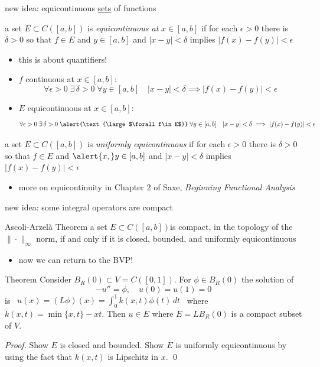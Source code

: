 \documentclass[10pt,
               svgnames,
               hyperref={colorlinks,
                         citecolor=DeepPink4,
                         linkcolor=FireBrick,
                         urlcolor=Maroon},
               usepdftitle=false]{beamer}
\newcommand{\eps}{\epsilon}
\newcommand{\textbook}{Saxe, \emph{Beginning Functional Analysis}}
\begin{document}
\begin{frame}{new idea: equicontinuous \underline{sets} of functions}

\begin{definition}
a set $E \subset C([a,b])$ is \emph{equicontinuous at } $x\in[a,b]$ if for each $\eps>0$ there is $\delta >0$ so that $f\in E$ and $y\in[a,b]$ and $|x-y|<\delta$ implies $|f(x)-f(y)|<\eps$
\end{definition}

\begin{itemize}
\item this is about quantifiers!
\item $f$ continuous at $x \in [a,b]$:
    $$\forall \eps>0 \; \exists\, \delta > 0 \; \forall y \in [a,b] \quad |x-y|<\delta \implies |f(x)-f(y)|<\eps$$
\item $E$ equicontinuous at $x \in [a,b]$:
    $$\forall \eps>0 \; \exists\, \delta > 0 \;\alert{\text{\large $\forall f\in E$}} \;  \forall y \in [a,b] \quad |x-y|<\delta \implies |f(x)-f(y)|<\eps$$
\end{itemize}

\begin{definition}
a set $E \subset C([a,b])$ is \emph{uniformly equicontinuous} if for each $\eps>0$ there is $\delta >0$ so that $f\in E$ and $\alert{x,}y\in[a,b]$ and $|x-y|<\delta$ implies $|f(x)-f(y)|<\eps$
\end{definition}

\begin{itemize}
\item more on equicontinuity in Chapter 2 of \textbook
\end{itemize}
\end{frame}


\begin{frame}{new idea: some integral operators are compact}

\begin{block}{Ascoli-Arzel\`a Theorem}
a set $E\subset C([a,b])$is compact, in the topology of the $\|\cdot\|_\infty$ norm, if and only if it is closed, bounded, and uniformly equicontinuous
\end{block}

\begin{itemize}
\item now we can return to the BVP!
\end{itemize}

\begin{block}{Theorem}
Consider $B_R(0)\subset V=C([0,1])$.  For $\phi \in B_R(0)$ the solution of
    $$-u'' = \phi, \quad u(0) = u(1) = 0$$
is \, $u(x) = (L\phi)(x) = \int_0^1 k(x,t) \phi(t)\,dt$ \, where $k(x,t) = \min\{x,t\} - xt$.  Then $u\in E$ where $E= LB_R(0)$ is a compact subset of $V$.
\end{block}

{\footnotesize
\noindent \emph{Proof.}  Show $E$ is closed and bounded.  Show $E$ is uniformly equicontinuous by using the fact that $k(x,t)$ is Lipschitz in $x$. \hfill \qed
}
\end{frame}
\end{document}
